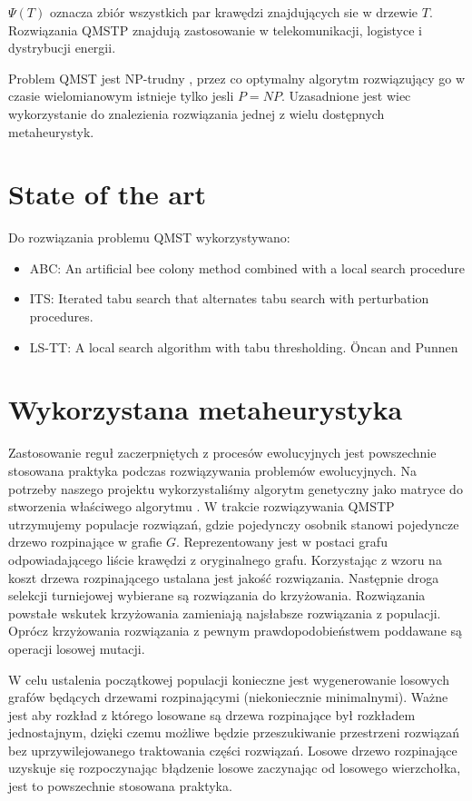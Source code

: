 \documentclass[12pt]{article}
\begin{document}
 $\Psi (T)$ oznacza zbiór wszystkich par krawędzi znajdujących sie w drzewie $T$. Rozwiązania QMSTP znajdują zastosowanie w telekomunikacji, logistyce i dystrybucji energii.
 
 Problem QMST jest NP-trudny \cite{Assad}, przez co optymalny algorytm rozwiązujący go w czasie wielomianowym istnieje tylko jesli $P=NP$. Uzasadnione jest wiec wykorzystanie do znalezienia rozwiązania jednej z wielu dostępnych metaheurystyk.
 
 
 \section{State of the art}
 
 Do rozwiązania problemu QMST wykorzystywano:
 \begin{itemize}
  \item ABC: An artificial bee colony method combined with a local search procedure \Cite{Sundar}
  \item ITS: Iterated tabu search that alternates tabu search with perturbation procedures. 
  \item LS-TT: A local search algorithm with tabu thresholding. Öncan and Punnen \Cite{Oncan}
\end{itemize}
 
 \section{Wykorzystana metaheurystyka}

Zastosowanie reguł zaczerpniętych z procesów ewolucyjnych jest powszechnie stosowana praktyka podczas rozwiązywania problemów ewolucyjnych. Na potrzeby naszego projektu wykorzystaliśmy algorytm genetyczny jako matryce do stworzenia właściwego algorytmu \Cite{Inspyred}. W trakcie rozwiązywania QMSTP utrzymujemy populacje rozwiązań, gdzie pojedynczy osobnik stanowi pojedyncze drzewo rozpinające w grafie $G$. Reprezentowany jest w postaci grafu odpowiadającego liście krawędzi z oryginalnego grafu. Korzystając z wzoru na koszt drzewa rozpinającego ustalana jest jakość rozwiązania. Następnie droga selekcji turniejowej wybierane są rozwiązania do krzyżowania. Rozwiązania powstałe wskutek krzyżowania zamieniają najsłabsze rozwiązania z populacji. Oprócz krzyżowania rozwiązania z pewnym prawdopodobieństwem poddawane są operacji losowej mutacji.


W celu ustalenia początkowej populacji konieczne jest wygenerowanie losowych grafów będących drzewami rozpinającymi (niekoniecznie minimalnymi). Ważne jest aby rozkład z którego losowane są drzewa rozpinające był rozkładem jednostajnym, dzięki czemu możliwe będzie przeszukiwanie przestrzeni rozwiązań bez uprzywilejowanego traktowania części rozwiązań. Losowe drzewo rozpinające uzyskuje się rozpoczynając błądzenie losowe zaczynając od losowego wierzchołka, jest to powszechnie stosowana praktyka\Cite{Wilson}.
\end{document}
